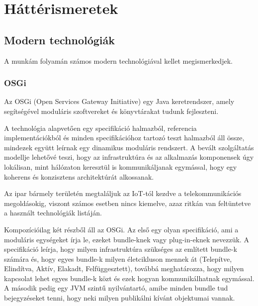 
\chapter{Háttérismeretek}
\section{Modern technológiák}

A munkám folyamán számos modern technológiával kellet megismerkedjek.

\subsection{OSGi}

Az OSGi (Open Services Gateway Initiative) \cite{alliance} egy Java keretrendszer, amely segítségével moduláris szoftvereket és könyvtárakat tudunk fejleszteni.

A technológia alapvetően egy specifikáció halmazból, referencia implementációkból és minden specifikációhoz tartozó teszt halmazból áll össze, mindezek együtt leírnak egy dinamikus moduláris rendszert. A bevált szolgáltatás modellje lehetővé teszi, hogy az infrastruktúra és az alkalmazás komponensek úgy lokálisan, mint hálózaton keresztül is kommunikáljanak egymással, hogy egy koherens és konzisztens architektúrát alkossanak.

Az ipar bármely területén megtaláljuk az IoT-tól kezdve a telekommunikációs megoldásokig, viszont számos esetben nincs kiemelve, azaz ritkán van feltüntetve a használt technológiák listáján. 

Kompozícióilag két részből áll az OSGi. Az első egy olyan specifikáció, ami a moduláris egységeket írja le, ezeket bundle-knek vagy plug-in-eknek nevezzük. A specifikáció leírja, hogy milyen infrastruktúra szükséges az említett bundle-k számára és, hogy egyes bundle-k milyen életcikluson mennek át (Telepítve, Elindítva, Aktív, Elakadt, Felfüggesztett), továbbá meghatározza, hogy milyen kapcsolat lehet egyes bundle-k közt és ezek hogyan kommunikálhatnak egymással. A második pedig egy JVM szintű nyilvántartó, amibe minden bundle tud bejegyzéseket tenni, hogy neki milyen publikálni kívánt objektumai vannak.



